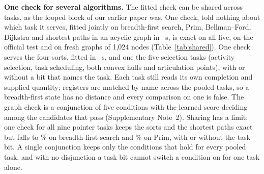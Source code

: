 \begin{table}[tbp]\centering\scriptsize
\caption{ grouped by what we supply by
hand. Supplied: the quantity given by hand; results that rely on one are ceilings for the fitted check. Fit: wall clock on one laptop core, from loading the training inputs to the fitted rule; strong components reuse
the depth-first check, with no fit of their own, so their time is the depth-first fit. Loops: the most the cold run took
on any test input. Official 64: the library's score on the
official test. Exact to: the largest held-out size, in nodes or items, at which every held-out input was exact, with the
code frozen. Ours, looped: the better of the general and the cold looped blocks of our earlier paper; FloydNet: its
reported score\cite{yu2026floydnet}; both from Supplementary Table~4 of ref.~\cite{mohsenvand2026zero}. The averages mix
ceilings with the method and are not a like-for-like comparison.}\label{tab:clrs}
\setlength{\tabcolsep}{4.5pt}

\end{table}

\textbf{One check for several algorithms.} The fitted check can be shared across tasks, as the looped block of our
earlier paper was. One check, told nothing about which task it serves, fitted jointly on breadth-first search, Prim,
Bellman--Ford, Dijkstra and shortest paths in an acyclic graph in ~s, is exact on all five, on the
official test and on fresh graphs of 1,024 nodes (Table~\ref{tab:shared}). One check serves the four sorts, fitted in
~s, and one the five selection tasks (activity selection, task scheduling, both convex hulls and
articulation points), with or without a bit that names the task. Each task still reads its own completion and supplied
quantity; registers are matched by name across the pooled tasks, so a breadth-first state has no distance and every
comparison on one is false. The graph check is a conjunction of five conditions with the learned score deciding among the
candidates that pass (Supplementary Note~2). Sharing has a limit: one check for all nine pointer tasks keeps the sorts and the shortest paths exact but
falls to \% on breadth-first search and \% on Prim, with or without the task bit.
A single conjunction keeps only the conditions that hold for every pooled task, and with no disjunction a task bit
cannot switch a condition on for one task alone.

